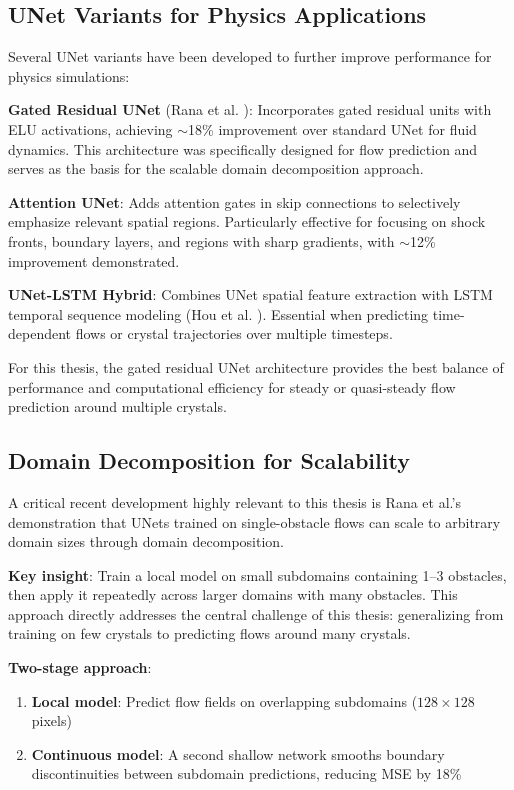\subsection{UNet Variants for Physics Applications}

Several UNet variants have been developed to further improve performance for physics simulations:

\textbf{Gated Residual UNet} (Rana et al. \cite{rana2024scalable_cnn}): Incorporates gated residual units with ELU activations, achieving $\sim$18\% improvement over standard UNet for fluid dynamics. This architecture was specifically designed for flow prediction and serves as the basis for the scalable domain decomposition approach.

\textbf{Attention UNet}: Adds attention gates in skip connections to selectively emphasize relevant spatial regions. Particularly effective for focusing on shock fronts, boundary layers, and regions with sharp gradients, with $\sim$12\% improvement demonstrated.

\textbf{UNet-LSTM Hybrid}: Combines UNet spatial feature extraction with LSTM temporal sequence modeling (Hou et al. \cite{hou2022unet_lstm}). Essential when predicting time-dependent flows or crystal trajectories over multiple timesteps.

For this thesis, the gated residual UNet architecture provides the best balance of performance and computational efficiency for steady or quasi-steady flow prediction around multiple crystals.

\subsection{Domain Decomposition for Scalability}

A critical recent development highly relevant to this thesis is Rana et al.'s \cite{rana2024scalable_cnn} demonstration that UNets trained on single-obstacle flows can scale to arbitrary domain sizes through domain decomposition.

\textbf{Key insight}: Train a local model on small subdomains containing 1--3 obstacles, then apply it repeatedly across larger domains with many obstacles. This approach directly addresses the central challenge of this thesis: generalizing from training on few crystals to predicting flows around many crystals.

\textbf{Two-stage approach}:
\begin{enumerate}
    \item \textbf{Local model}: Predict flow fields on overlapping subdomains ($128 \times 128$ pixels)
    \item \textbf{Continuous model}: A second shallow network smooths boundary discontinuities between subdomain predictions, reducing MSE by 18\%
\end{enumerate}

